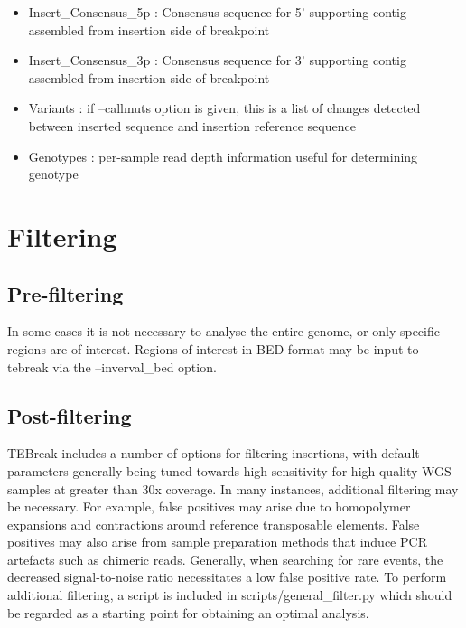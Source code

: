 \documentclass[letterpaper,11pt]{article}
\begin{document}
\begin{itemize}
\item Insert\_Consensus\_5p : Consensus sequence for 5' supporting contig assembled from insertion side of breakpoint
\item Insert\_Consensus\_3p : Consensus sequence for 3' supporting contig assembled from insertion side of breakpoint
\item Variants : if --callmuts option is given, this is a list of changes detected between inserted sequence and insertion reference sequence
\item Genotypes : per-sample read depth information useful for determining genotype
\end{itemize}

\section{Filtering}


\subsection{Pre-filtering}
In some cases it is not necessary to analyse the entire genome, or only specific regions are of interest. Regions of interest in BED format may be input to tebreak via the --inverval\_bed option.


\subsection{Post-filtering}
TEBreak includes a number of options for filtering insertions, with default parameters generally being tuned towards high sensitivity for high-quality WGS samples at greater than 30x coverage. In many instances, additional filtering may be necessary. For example, false positives may arise due to homopolymer expansions and contractions around reference transposable elements. False positives may also arise from sample preparation methods that induce PCR artefacts such as chimeric reads. Generally, when searching for rare events, the decreased signal-to-noise ratio necessitates a low false positive rate. To perform additional filtering, a script is included in scripts/general\_filter.py which should be regarded as a starting point for obtaining an optimal analysis.
\end{document}
